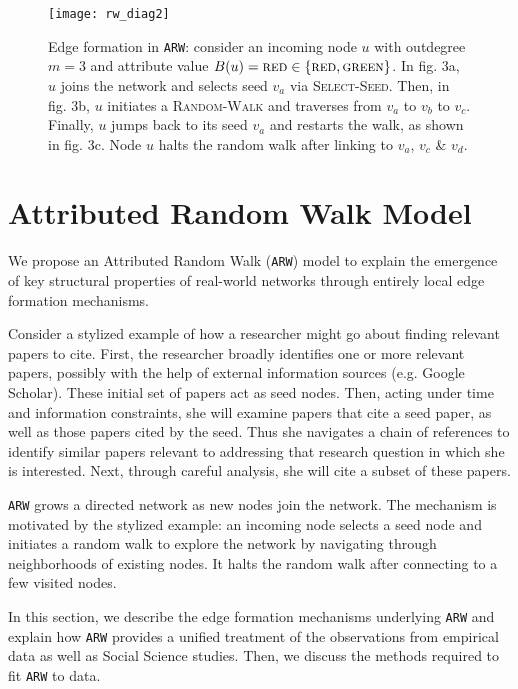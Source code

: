 \begin{figure*}
	\vspace{-20pt}
    \centering
    \texttt{[image: rw\_diag2]}
    \caption{Edge formation in \texttt{ARW}: consider
    an incoming node $u$ with outdegree ${m=3}$ and attribute value {$B(u)=\textsc{red} \in \{\textsc{red},\textsc{green}\}$}.
    In fig. 3a, $u$ joins the network and selects seed $v_a$ via \textsc{Select-Seed}.
    Then, in fig. 3b, $u$ initiates a \textsc{Random-Walk} and traverses from $v_a$ to $v_b$ to $v_c$.
    Finally, $u$ jumps back to its seed $v_a$ and restarts the walk, as shown in fig. 3c.
    Node $u$ halts the random walk after linking to $v_a$, $v_c$ \& $v_d$.
    }
    \label{fig:randomwalk}
	\vspace{-8pt}
\end{figure*}

\section{Attributed Random Walk Model}
\label{sec:Proposed Model}
We propose an Attributed Random Walk (\texttt{ARW}) model to explain the emergence
of key structural properties of real-world networks through {entirely local}
edge formation mechanisms.

Consider a stylized example of how a researcher might go about finding relevant papers to cite. First, the researcher broadly identifies one or more {relevant} papers,
possibly with the help of external information sources (e.g. Google Scholar). These initial set of papers act as seed nodes.  Then, acting under time and information constraints, she will examine papers that cite a seed paper, as well as those papers cited by the seed. Thus she navigates a chain of references to identify {similar} papers relevant to addressing that research question in which she is interested. Next, through careful analysis, she will cite a subset of these papers.

\texttt{ARW} grows a directed network as new nodes join the network. The
mechanism is motivated by the stylized example: an incoming node selects a seed node and initiates a random walk to explore the network by navigating through neighborhoods of existing nodes. It halts the random walk after connecting to a few visited nodes.

In this section, we describe the edge formation mechanisms underlying
\texttt{ARW} and explain how \texttt{ARW} provides a unified treatment of
the observations from empirical data as well as Social Science studies. Then,
we discuss the methods required to fit \texttt{ARW} to data.

